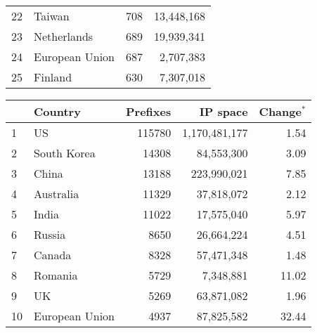 \begin{table*}[p]
\begin{minipage}[t]{0.48\textwidth}
\begin{center}
\begin{tabular}{|l||l|r|r|}
22      &       Taiwan  		&       708     &       13,448,168      \tabularnewline %
23      &       Netherlands     &       689     &       19,939,341      \tabularnewline %
24      &       European Union  &       687     &       2,707,383       \tabularnewline %
25      &       Finland 		&       630     &       7,307,018       \tabularnewline %
	\hline
	\end{tabular}
	\end{center}
\end{minipage}
%
\quad
%
\begin{minipage}[t]{0.48\textwidth}
	\begin{center}
	\caption{Top 25 countries with the most number of announced prefixes in BGP table on \textbf{April 23, 2009}}
	\label{tab:top25 bgp prefixes 2009}
	\begin{tabular}{|l||l|r|r|r|}
		\hline
		&      \bf Country		& \bf Prefixes  &       \bf IP space 	& \bf Change$^{*}$ 	\tabularnewline \hline 
1       &       US      		&       115780  &       1,170,481,177   & 1.54			\tabularnewline %
2       &       South Korea     &       14308   &       84,553,300      & 3.09			\tabularnewline %
3       &       China  			&       13188   &       223,990,021     & 7.85			\tabularnewline %
4       &       Australia       &       11329   &       37,818,072      & 2.12			\tabularnewline %
5       &       India   		&       11022   &       17,575,040      & 5.97			\tabularnewline %
6       &       Russia  		&       8650    &       26,664,224      & 4.51			\tabularnewline %
7       &       Canada  		&       8328    &       57,471,348      & 1.48			\tabularnewline %
8       &       Romania 		&       5729    &       7,348,881       & 11.02			\tabularnewline %
9       &       UK      		&       5269    &       63,871,082      & 1.96			\tabularnewline %
10      &       European Union  &       4937    &       87,825,582      & 32.44			\tabularnewline %

\end{tabular}
\end{center}
\end{minipage}
\end{table*}
